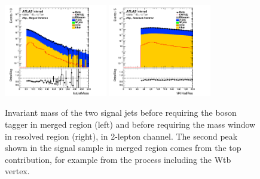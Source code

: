 \begin{figure}[H]
    \centering
     \includegraphics[width=0.40\textwidth]{figures/2lep/dataMC/C_0ptag1pfat0pjet_0ptv_MergedCommon_fatJetMass_Log} 
     \includegraphics[width=0.40\textwidth]{figures/2lep/dataMC/C_0ptag2pjet_0ptv_ResolvedCommon_MVHadRes_Log}
    \caption{Invariant mass of the two signal jets before requiring the boson tagger in merged region (left) and before requiring the mass window in resolved region (right), in 2-lepton channel. 
    The second peak shown in the signal sample in merged region comes from the top contribution, for example from the process including the Wtb vertex.
    }
    \label{fig:MVHadResSR}
\end{figure}

